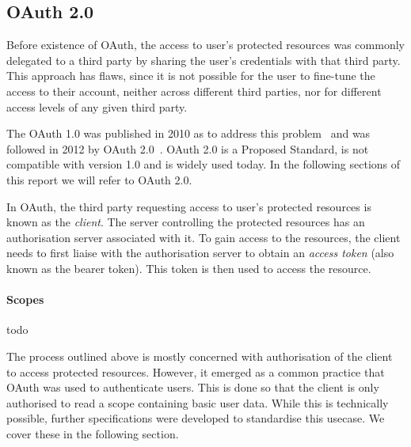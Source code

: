 \subsection{OAuth 2.0} \label{OAuth_2}

Before existence of OAuth, the access to user's protected resources was commonly delegated to a third party by sharing the user's credentials with that third party. This approach has flaws, since it is not possible for the user to fine-tune the access to their account, neither across different third parties, nor for different access levels of any given third party. 

The OAuth 1.0 was published in 2010 as to address this problem~\cite{Hammer-Lahav2010TheProtocol} and was followed in 2012 by OAuth 2.0~\cite{Hardt2012TheFramework}. OAuth 2.0 is a Proposed Standard, is not compatible with version 1.0 and is widely used today. In the following sections of this report we will refer to OAuth 2.0.

In OAuth, the third party requesting access to user's protected resources is known as the \textit{client}. The server controlling the protected resources has an authorisation server associated with it. To gain access to the resources, the client needs to first liaise with the authorisation server to obtain an \textit{access token} (also known as the bearer token). This token is then used to access the resource.



\paragraph{Scopes}
todo

The process outlined above is mostly concerned with authorisation of the client to access protected resources. However, it emerged as a common practice
that OAuth was used to authenticate users. This is done so that the client is only authorised to read a scope containing basic user data. While this is technically possible, further specifications were developed to standardise this usecase. We cover these in the following section.
